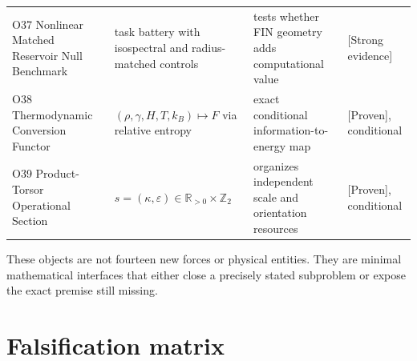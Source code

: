 \documentclass[11pt,a4paper,openany]{report}
\newcommand{\statusProven}{\textcolor{fingreen}{[Proven]}}
\newcommand{\statusStrong}{\textcolor{finblue}{[Strong evidence]}}
\begin{document}
\begin{center}
\begin{longtable}{@{}p{}p{}p{}p{}@{}}
O37 Nonlinear Matched Reservoir Null Benchmark & task battery with isospectral and radius-matched controls & tests whether FIN geometry adds computational value & \statusStrong{} \\
O38 Thermodynamic Conversion Functor & \((\rho,\gamma,H,T,k_B)\mapsto F\) via relative entropy & exact conditional information-to-energy map & \statusProven{}, conditional \\
O39 Product-Torsor Operational Section & \(s=(\kappa,\varepsilon)\in\mathbb R_{>0}\times\mathbb Z_2\) & organizes independent scale and orientation resources & \statusProven{}, conditional \\
\bottomrule
\end{longtable}
\endgroup
\end{center}

These objects are not fourteen new forces or physical entities. They are minimal mathematical interfaces that either close a precisely stated subproblem or expose the exact premise still missing.

\chapter{Falsification matrix}
\end{document}
